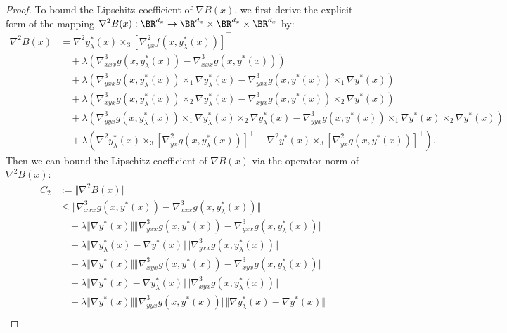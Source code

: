 \begin{proof}
To bound the Lipschitz coefficient of $\nabla B(x)$,
we first derive the explicit form of the mapping $\nabla^2 B(x): \BR^{d_x} \rightarrow \BR^{d_x} \times \BR^{d_x} \times \BR^{d_x} $ by:
\begin{align*}
    \nabla^2 B(x) 
    &= 
    \nabla^2 y_{\lambda}^*(x) \times_3 [\nabla_{yx}^2 f(x,y_{\lambda}^*(x))]^\top \\
    &\quad + \lambda ( \nabla_{xxx}^3 g(x,y_{\lambda}^*(x)) - \nabla_{xxx}^3 g(x,y^*(x)) ) \\
    &\quad + \lambda ( 
    \nabla_{yxx}^3 g(x,y_{\lambda}^*(x)) \times_1 \nabla y_{\lambda}^*(x) - \nabla_{yxx}^3 g(x,y^*(x)) \times_1 \nabla y^*(x) 
    ) \\
    &\quad + \lambda \left(  \nabla_{xyx}^3 g(x,y_{\lambda}^*(x)) \times_2 \nabla y_{\lambda}^*(x) - \nabla_{xyx}^3 g(x,y^*(x))   \times_2 \nabla y^*(x) \right)  \\
    &\quad + \lambda \left( 
     \nabla_{yyx}^3 g(x,y_{\lambda}^*(x)) \times_1 \nabla y_{\lambda}^*(x) \times_2  \nabla y_{\lambda}^*(x)   - 
    \nabla_{yyx}^3 g(x,y^*(x)) \times_1 \nabla y^*(x)  \times_2 \nabla y^*(x)
    \right) \\
    &\quad + \lambda \left(  \nabla^2 y_{\lambda}^*(x) \times_3 [\nabla_{yx}^2 g(x,y_{\lambda}^*(x))]^\top -  \nabla^2 y^*(x) \times_3 [\nabla_{yx}^2 g(x,y^*(x))]^\top\right)
    .
\end{align*}
Then we can bound the Lipschitz coefficient of $\nabla B(x)$
via the operator norm of $\nabla^2 B(x)$:
\begin{align*}
   C_2&:= \Vert \nabla^2 B(x) \Vert \\
    &\le 
    \Vert \nabla_{xxx}^3 g(x,y^*(x)) - 
    \nabla_{xxx}^3 g(x,y_{\lambda}^*(x))\Vert  \\
    &\quad + \lambda \Vert \nabla y^*(x) \Vert \Vert \nabla_{yxx}^3 g(x,y^*(x)) - \nabla_{yxx}^3 g(x,y_{\lambda}^*(x)) \Vert \\
    &\quad+ \lambda \Vert \nabla y_{\lambda}^*(x) - \nabla y^*(x) \Vert \Vert \nabla_{yxx}^3 g(x,y_{\lambda}^*(x)) \Vert \\
    &\quad + \lambda \Vert \nabla y^*(x) \Vert \Vert \nabla_{xyx}^3 g(x,y^*(x)) - \nabla_{xyx}^3 g(x,y_{\lambda}^*(x)) \Vert  \\
    &\quad + \lambda \Vert \nabla y^*(x) - \nabla y_{\lambda}^*(x) \Vert \Vert \nabla_{xyx}^3 g(x,y_{\lambda}^*(x)) \Vert \\
    &\quad + \lambda \Vert \nabla y^*(x) \Vert \Vert \nabla_{yyx}^3 g(x,y^*(x)) \Vert  \Vert \nabla y_{\lambda}^*(x) - \nabla y^*(x) \Vert  \\

\end{align*}
\end{proof}
